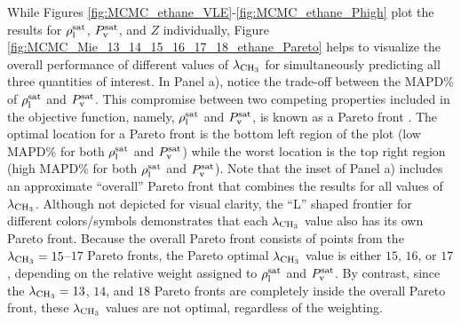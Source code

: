 \documentclass[preprint,letterpaper,floatfix,citeautoscript,aip,jcp]{revtex4-1}
\begin{document}
While Figures \ref{fig:MCMC_ethane_VLE}-\ref{fig:MCMC_ethane_Phigh} plot the results for $\rho_{\rm l}^{\rm sat}$, $P_{\rm v}^{\rm sat}$, and $Z$ individually, Figure \ref{fig:MCMC_Mie_13_14_15_16_17_18_ethane_Pareto} helps to visualize the overall performance of different values of $\lambda_{\rm CH_3}$ for simultaneously predicting all three quantities of interest. 
In Panel a), notice the trade-off between the MAPD\% of $\rho_{\rm l}^{\rm sat}$ and $P_{\rm v}^{\rm sat}$. This compromise between two competing properties included in the objective function, namely, $\rho_{\rm l}^{\rm sat}$ and $P_{\rm v}^{\rm sat}$, is known as a Pareto front \cite{Pareto_Deriv,Pareto_LJPQ,Pareto_ST}. The optimal location for a Pareto front is the bottom left region of the plot (low MAPD\% for both $\rho_{\rm l}^{\rm sat}$ and $P_{\rm v}^{\rm sat}$) while the worst location is the top right region (high MAPD\% for both $\rho_{\rm l}^{\rm sat}$ and $P_{\rm v}^{\rm sat}$). Note that the inset of Panel a) includes an approximate ``overall'' Pareto front that combines the results for all values of $\lambda_{\rm CH_3}$. Although not depicted for visual clarity, the ``L'' shaped frontier for different colors/symbols demonstrates that each $\lambda_{\rm CH_3}$ value also has its own Pareto front. Because the overall Pareto front consists of points from the $\lambda_{\rm CH_3} = 15$--$17$ Pareto fronts, the Pareto optimal $\lambda_{\rm CH_3}$ value is either $15$, $16$, or $17$, depending on the relative weight assigned to $\rho_{\rm l}^{\rm sat}$ and $P_{\rm v}^{\rm sat}$. By contrast, since the $\lambda_{\rm CH_3} = 13$, $14$, and $18$ Pareto fronts are completely inside the overall Pareto front, these $\lambda_{\rm CH_3}$ values are not optimal, regardless of the weighting.
\end{document}
